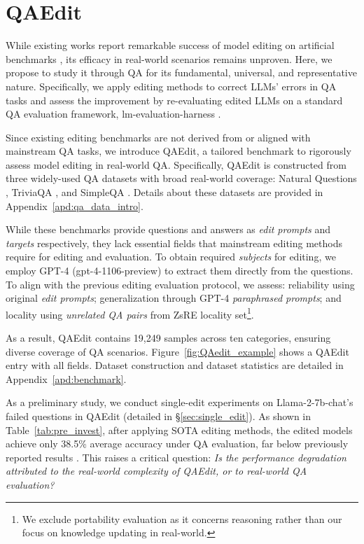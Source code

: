 
\section{QAEdit}  
\label{sec:qaedit}


While existing works report remarkable success of model editing on artificial benchmarks \cite{meng2023locating, wang2024wise}, its efficacy in real-world scenarios remains unproven.
Here, we propose to study it through QA for its fundamental, universal, and representative nature. 
Specifically, we apply editing methods to correct LLMs' errors in QA tasks and assess the improvement by re-evaluating edited LLMs on a standard QA evaluation framework,  lm-evaluation-harness \cite{eval-harness}.




Since existing editing benchmarks are not derived from or aligned with mainstream QA tasks, we introduce QAEdit, a tailored benchmark to rigorously assess model editing in real-world QA. 
Specifically, QAEdit is constructed from three widely-used QA datasets with broad real-world coverage:  Natural Questions \cite{kwiatkowski2019nq}, TriviaQA \cite{joshi-etal-2017-triviaqa}, and SimpleQA \cite{wei2024measuringshortformfactualitylarge}.
Details about these datasets are provided in Appendix~\ref{apd:qa_data_intro}.





While these benchmarks provide questions and answers as \textit{edit prompts} and \textit{targets} respectively, they lack essential fields that mainstream editing methods require for editing and evaluation.
To obtain required \textit{subjects} for editing, we employ GPT-4 (gpt-4-1106-preview) to extract them directly from the questions.
To align with the previous editing evaluation protocol, we assess: reliability using original \textit{edit prompts}; generalization through GPT-4 \textit{paraphrased prompts}; and locality using \textit{unrelated QA pairs} from ZsRE locality set\footnote{We exclude portability evaluation as it concerns reasoning rather than our focus on knowledge updating in real-world.}.

As a result, QAEdit contains 19,249 samples across ten categories, ensuring diverse coverage of QA scenarios. 
Figure~\ref{fig:QAedit_example} shows a QAEdit entry with all fields.
Dataset construction and dataset statistics are detailed in Appendix~\ref{apd:benchmark}.



As a preliminary study, we conduct single-edit experiments on Llama-2-7b-chat's failed questions in QAEdit (detailed in \S\ref{sec:single_edit}). 
As shown in Table~\ref{tab:pre_invest}, after applying SOTA editing methods, the edited models achieve only 38.5\% average accuracy under QA evaluation, far below previously reported results \cite{meng2023massediting, wang2024wise}.
This raises a critical question: \textit{Is the performance degradation attributed to the real-world complexity of QAEdit, or to real-world QA evaluation?}





